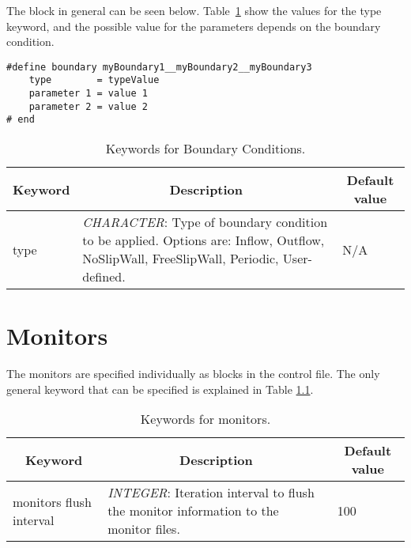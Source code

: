 \documentclass[a4paper,10pt]{report}
\begin{document}
The block in general can be seen below. Table~\ref{tab:BC} show the values for the type keyword, and the possible value for the parameters depends on the boundary condition.

\begin{lstlisting}
#define boundary myBoundary1__myBoundary2__myBoundary3
	type        = typeValue
	parameter 1 = value 1
	parameter 2 = value 2
# end
\end{lstlisting}


\begin{table}[h]
\caption{Keywords for Boundary Conditions.}\label{tab:BC} 

\begin{tabular}{|p{4cm}|p{10cm}|p{2.2cm}|}
\hline
\multicolumn{1}{|c|}{\textbf{Keyword}} & \multicolumn{1}{c|}{\textbf{Description}} & \multicolumn{1}{c|}{\textbf{Default value}} \\ \hline

type 	& 
		\textit{CHARACTER}: Type of boundary condition to be applied. Options are: Inflow, Outflow, NoSlipWall, FreeSlipWall, Periodic, User-defined. & 
							N/A \\ \hline

\end{tabular}
\end{table}



\chapter{Monitors}\label{chap.monitors}

The monitors are specified individually as blocks in the control file.
The only general keyword that can be specified is explained in Table \ref{tab:monitorsKey}.

\begin{table}[h]
\caption{Keywords for monitors.} \label{tab:monitorsKey} 

\begin{tabular}{|p{4cm}|p{10cm}|p{2.2cm}|}
\hline
\multicolumn{1}{|c|}{\textbf{Keyword}} & \multicolumn{1}{c|}{\textbf{Description}} & \multicolumn{1}{c|}{\textbf{Default value}} \\ \hline

monitors flush interval 	& 
			\textit{INTEGER}: Iteration interval to flush the monitor information to the monitor files. & 
							100 \\ \hline

\end{tabular}
\end{table}
\end{document}
